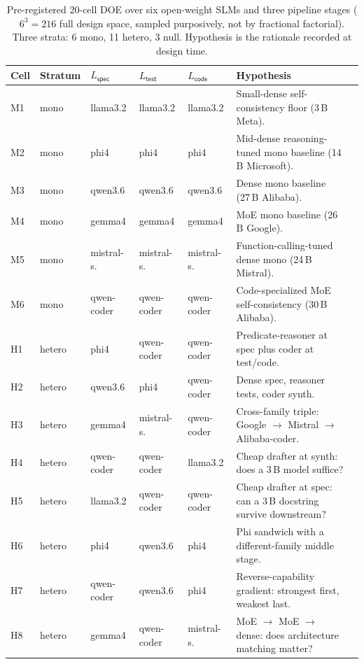 \begin{table}[!htbp]
\centering
\footnotesize
\caption{Pre-registered 20-cell DOE over six open-weight SLMs and three pipeline stages ($6^3 = 216$ full design space, sampled purposively, not by fractional factorial). Three strata: 6 mono, 11 hetero, 3 null. Hypothesis is the rationale recorded at design time.}
\label{tab:doe_summary}
\setlength{\tabcolsep}{4pt}
\begin{tabular}{@{}llllllp{4.5cm}@{}}
\toprule
Cell & Stratum & $L_{\textsf{spec}}$ & $L_{\textsf{test}}$ & $L_{\textsf{code}}$ & Hypothesis \\
\midrule
M1 & mono & llama3.2 & llama3.2 & llama3.2 & Small-dense self-consistency floor (3\,B Meta). \\
M2 & mono & phi4 & phi4 & phi4 & Mid-dense reasoning-tuned mono baseline (14\,B Microsoft). \\
M3 & mono & qwen3.6 & qwen3.6 & qwen3.6 & Dense mono baseline (27\,B Alibaba). \\
M4 & mono & gemma4 & gemma4 & gemma4 & MoE mono baseline (26\,B Google). \\
M5 & mono & mistral-s. & mistral-s. & mistral-s. & Function-calling-tuned dense mono (24\,B Mistral). \\
M6 & mono & qwen-coder & qwen-coder & qwen-coder & Code-specialized MoE self-consistency (30\,B Alibaba). \\
H1 & hetero & phi4 & qwen-coder & qwen-coder & Predicate-reasoner at spec plus coder at test/code. \\
H2 & hetero & qwen3.6 & phi4 & qwen-coder & Dense spec, reasoner tests, coder synth. \\
H3 & hetero & gemma4 & mistral-s. & qwen-coder & Cross-family triple: Google $\to$ Mistral $\to$ Alibaba-coder. \\
H4 & hetero & qwen-coder & qwen-coder & llama3.2 & Cheap drafter at synth: does a 3\,B model suffice? \\
H5 & hetero & llama3.2 & qwen-coder & qwen-coder & Cheap drafter at spec: can a 3\,B docstring survive downstream? \\
H6 & hetero & phi4 & qwen3.6 & phi4 & Phi sandwich with a different-family middle stage. \\
H7 & hetero & qwen-coder & qwen3.6 & phi4 & Reverse-capability gradient: strongest first, weakest last. \\
H8 & hetero & gemma4 & qwen-coder & mistral-s. & MoE $\to$ MoE $\to$ dense: does architecture matching matter? \\

\end{tabular}
\end{table}
